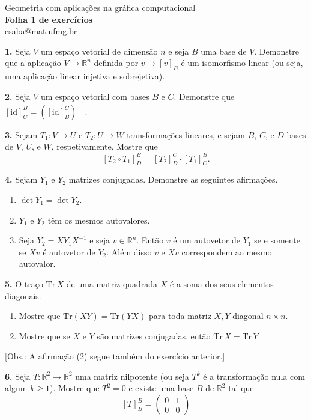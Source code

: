 \documentclass{amsart}
\newcommand{\R}{\mathbb R}
\begin{document}
\begin{center}
\large Geometria com aplicações na gráfica computacional\\
{\bf\large Folha 1 de exercícios}\\
csaba@mat.ufmg.br
\end{center}


\bigskip

{\bf 1.} 
Seja $V$ um espaço vetorial de dimensão $n$ e seja $B$ uma base de $V$.    
Demonstre que a aplicação $V\to \R^n$ definida por $v\mapsto [v]_B$ é um isomorfismo linear (ou seja, uma aplicação linear 
    injetiva e sobrejetiva).

\medskip

{\bf 2.} Seja $V$ um espaço vetorial com bases $B$ e $C$.
    Demonstre que $[\mbox{id}]_C^B=([\mbox{id}]_B^C)^{-1}$. 

    \medskip

{\bf 3.} Sejam $T_1:V\to U$ e $T_2:U\to W$ transformações lineares, e sejam $B$, $C$, e $D$ bases de 
$V$, $U$, e $W$, respetivamente. Mostre que 
\[
[T_2\circ T_1]^B_D=[T_2]^C_D\cdot [T_1]^B_C.
\]

\medskip


{\bf 4.} 
    Sejam $Y_1$ e $Y_2$ matrizes conjugadas. Demonstre as seguintes afirmações. 
    \begin{enumerate}
        \item $\det Y_1=\det Y_2$.
        \item $Y_1$ e $Y_2$ têm os mesmos autovalores.
        \item Seja $Y_2=XY_1X^{-1}$ e seja $v\in\R^n$. Então $v$ é um autovetor de $Y_1$ se e somente se 
        $Xv$ é autovetor de $Y_2$. Além disso $v$ e $Xv$ correspondem ao mesmo autovalor.
    \end{enumerate}

    \medskip

{\bf 5.} O traço $\mbox{Tr}\,X$ de uma matriz quadrada $X$ é a soma dos seus elementos diagonais. 
\begin{enumerate}
    \item Mostre que $\mbox{Tr}(XY)=\mbox{Tr}(YX)$ para toda matriz $X,Y$ diagonal $n\times n$.
    \item Mostre que se $X$ e $Y$ são matrizes conjugadas, então $\mbox{Tr}\,X=\mbox{Tr}\,Y$.
\end{enumerate}
[Obs.: A afirmação (2) segue também do exercício anterior.]

\medskip


{\bf 6.} Seja $T:\R^2\to \R^2$ uma matriz nilpotente (ou seja $T^k$ é a transformação nula com algum $k\geq 1$).
Mostre que $T^2=0$ e existe uma base $B$ de $\R^2$ tal que 
\[
    [T]_B^B=\begin{pmatrix} 0 & 1 \\ 0 & 0 \end{pmatrix}
\]
\end{document}
